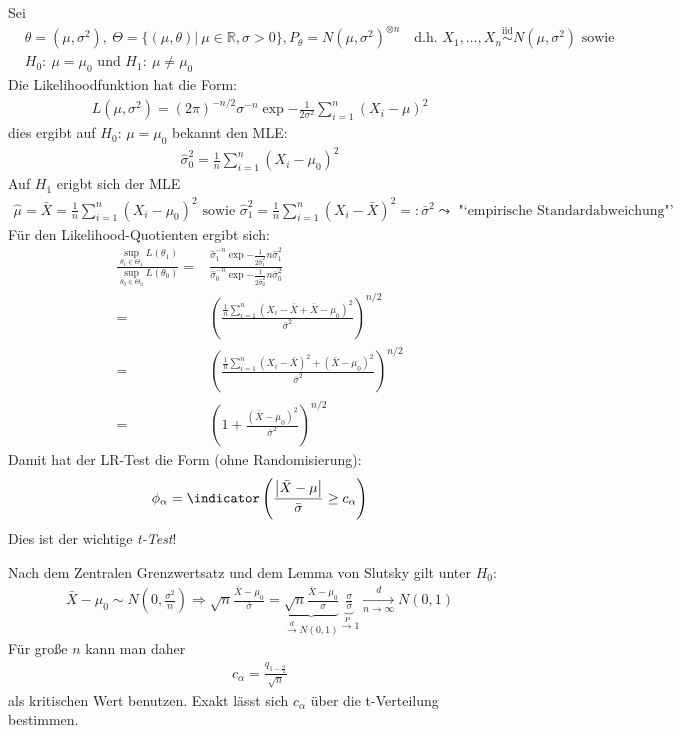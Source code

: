 \documentclass[a4paper]{scrartcl}
\begin{document}
		\begin{example}[t-Test]
			Sei
			\begin{align*}
				&\theta=(\mu,\sigma^2),~\Theta=\{(\mu,\theta)|~\mu\in\mathbb{R},\sigma>0\}, P_\theta=N(\mu,\sigma^2)^{\otimes n}\quad\text{d.h. }X_1,\dots,X_n\overset{\text{iid}}{\sim}N(\mu,\sigma^2)\text{ sowie}\\
				&H_0\colon~\mu=\mu_0\text{ und }H_1\colon~\mu\neq \mu_0
			\end{align*}
			Die Likelihoodfunktion hat die Form:
			\begin{align*}
				L(\mu,\sigma^2)=(2\pi)^{-n/2}\sigma^{-n}\exp{-\frac{1}{2\sigma^2}\sum_{i=1}^n(X_i-\mu)^2}
			\end{align*}
			dies ergibt auf $H_0$: $\mu=\mu_0$ bekannt den MLE:
			\begin{align*}
				\hat{\sigma}_0^2=\frac{1}{n}\sum_{i=1}^n(X_i-\mu_0)^2
			\end{align*}
			Auf $H_1$ erigbt sich der MLE
			\begin{align*}
				\hat{\mu}=\bar{X}=\frac{1}{n}\sum_{i=1}^n(X_i-\mu_0)^2\text{ sowie }\hat{\sigma}_1^2=\frac{1}{n}\sum_{i=1}^n(X_i-\bar{X})^2=\colon\bar{\sigma}^2\leadsto\text{ "`empirische Standardabweichung"'}
			\end{align*}
			Für den Likelihood-Quotienten ergibt sich:
			\begin{align*}
				\frac{\sup_{\theta_1\in\Theta_1}L(\theta_1)}{\sup_{\theta_0\in\Theta_0}L(\theta_0)}=&\frac{\hat{\sigma}_1^{-n}\exp{-\frac{1}{2\hat{\sigma}_1^2}n\hat{\sigma}_1^2}}{\hat{\sigma}_0^{-n}\exp{-\frac{1}{2\hat{\sigma}_0^2}n\bar{\sigma}_0^2}}\\
				=&\left(\frac{\frac{1}{n}\sum_{i=1}^n\left(X_i-\bar{X}+\bar{X}-\mu_0\right)^2}{\bar{\sigma}^2}\right)^{n/2}\\
				=&\left(\frac{\frac{1}{n}\sum_{i=1}^n\left(X_i-\bar{X}\right)^2+\left(\bar{X}-\mu_0\right)^2}{\bar{\sigma}^2}\right)^{n/2}\\
				=&\left(1+\frac{\left(\bar{X}-\mu_0\right)^2}{\bar{\sigma}^2}\right)^{n/2}
			\end{align*}
			Damit hat der LR-Test die Form (ohne Randomisierung):
			\begin{align*}
				\phi_\alpha=\indicator\left(\frac{\left|\bar{X}-\mu\right|}{\bar{\sigma}}\ge c_\alpha\right)
			\end{align*}
			Dies ist der wichtige \emph{t-Test}!
			
			Nach dem Zentralen Grenzwertsatz und dem Lemma von Slutsky gilt unter $H_0$:
			\begin{align*}
				\bar{X}-\mu_0\sim N\left(0,\frac{\sigma^2}{n}\right)\Rightarrow \sqrt{n}\frac{\bar{X}-\mu_0}{\bar{\sigma}}=\underbrace{\sqrt{n}\frac{\bar{X}-\mu_0}{\sigma}}_{\xrightarrow{d}N(0,1)}\underbrace{\frac{\sigma}{\bar{\sigma}}}_{\xrightarrow{P}1}\xrightarrow[n\to\infty]{d}N(0,1)
			\end{align*}
			Für große $n$ kann man daher 
			\begin{align*}
				c_\alpha=\frac{q_{1-\frac{\alpha}{2}}}{\sqrt{n}}
			\end{align*}
			als kritischen Wert benutzen. Exakt lässt sich $c_\alpha$ über die t-Verteilung bestimmen.
		\end{example}
\end{document}
